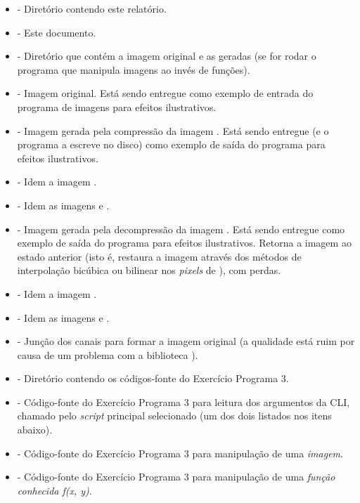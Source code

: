 \documentclass[11pt]{article}
\begin{document}
\begin{itemize}
  \item {} - Diretório contendo este relatório.
  \item {} - Este documento.
  \item {} - Diretório que contém a imagem original e as geradas (se for rodar o programa que manipula imagens ao invés de funções).
  \item {} - Imagem original. Está sendo entregue como exemplo de entrada do programa de imagens para efeitos ilustrativos.
  \item {} - Imagem gerada pela compressão da imagem {}. Está sendo entregue (e o programa a escreve no disco) como exemplo de saída do programa para efeitos ilustrativos.
  \item {} - Idem a imagem {}.
  \item {} - Idem as imagens {} e {}.
  \item {} - Imagem gerada pela decompressão da imagem {}. Está sendo entregue como exemplo de saída do programa para efeitos ilustrativos.
  Retorna a imagem ao estado anterior (isto é, restaura a imagem {} através dos métodos de interpolação bicúbica ou bilinear nos \textit{pixels} de {}), com perdas.
  \item {} - Idem a imagem {}.
  \item {} - Idem as imagens {} e {}.
  \item {} - Junção dos canais para formar a imagem original (a qualidade está ruim por causa de um problema com a biblioteca {}).
  \item {} - Diretório contendo os códigos-fonte do Exercício Programa 3.
  \item {} - Código-fonte do Exercício Programa 3 para leitura dos argumentos da CLI, chamado pelo \textit{script} principal selecionado (um dos dois listados nos itens abaixo).
  \item {} - Código-fonte do Exercício Programa 3 para manipulação de uma \textit{imagem}.
  \item {} - Código-fonte do Exercício Programa 3 para manipulação de uma \textit{função conhecida f(x, y)}.
\end{itemize}
\end{document}
